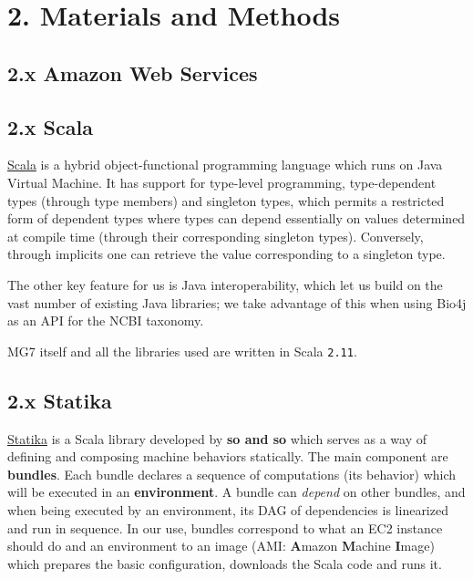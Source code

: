 \documentclass{frontiersSCNS} %
\begin{document}
\section{2. Materials and Methods}\label{materials-and-methods}

\subsection{2.x Amazon Web Services}\label{x-amazon-web-services}

\subsection{2.x Scala}\label{x-scala}

\href{http://www.scala-lang.org/}{Scala} is a hybrid object-functional
programming language which runs on Java Virtual Machine. It has support
for type-level programming, type-dependent types (through type members)
and singleton types, which permits a restricted form of dependent types
where types can depend essentially on values determined at compile time
(through their corresponding singleton types). Conversely, through
implicits one can retrieve the value corresponding to a singleton type.

The other key feature for us is Java interoperability, which let us
build on the vast number of existing Java libraries; we take advantage
of this when using Bio4j as an API for the NCBI taxonomy.

MG7 itself and all the libraries used are written in Scala
\texttt{2.11}.

\subsection{2.x Statika}\label{x-statika}

\href{https://github.com/ohnosequences/statika}{Statika} is a Scala
library developed by \textbf{so and so} which serves as a way of
defining and composing machine behaviors statically. The main component
are \textbf{bundles}. Each bundle declares a sequence of computations
(its behavior) which will be executed in an \textbf{environment}. A
bundle can \emph{depend} on other bundles, and when being executed by an
environment, its DAG of dependencies is linearized and run in sequence.
In our use, bundles correspond to what an EC2 instance should do and an
environment to an image (AMI: \textbf{A}mazon \textbf{M}achine
\textbf{I}mage) which prepares the basic configuration, downloads the
Scala code and runs it.
\end{document}
